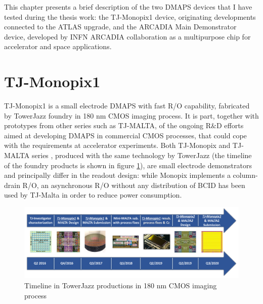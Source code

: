 This chapter presents a brief description of the two DMAPS devices that I have tested during the thesis work: the TJ-Monopix1 device, originating developments connected to the ATLAS upgrade, and the ARCADIA Main Demonstrator device, developed by INFN ARCADIA collaboration as a multipurpose chip for accelerator and space applications.

\section{TJ-Monopix1}
TJ-Monopix1 is a small electrode DMAPS with fast R/O capability, fabricated by TowerJazz foundry in 180 nm CMOS imaging process.
It is part, together with prototypes from other series such as TJ-MALTA, of the ongoing R$\&$D efforts aimed at developing DMAPS in commercial CMOS processes, that could cope with the requirements at accelerator experiments.
Both TJ-Monopix and TJ-MALTA series \cite{MALTA}, produced with the same technology by TowerJazz (the timeline of the foundry products is shown in figure \ref{fig:TJ180nm}), are small electrode demonstrators and principally differ in the readout design: while Monopix implements a column-drain R/O, an asynchronous R/O without any distribution of BCID has been used by TJ-Malta in order to reduce power consumption.

\begin{figure}[h!]
    \centering
    \includegraphics[width=.95\linewidth]{figures/Monopix1/TJ180nm.png}
    \caption{Timeline in TowerJazz productions in 180 nm CMOS imaging process}
    \label{fig:TJ180nm}
\end{figure} 

